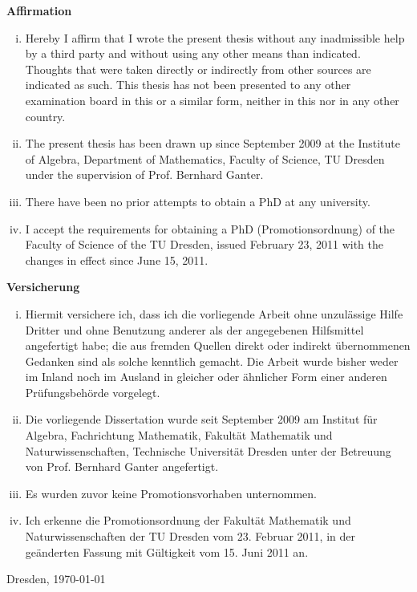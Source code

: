 \cleardoublepage
\thispagestyle{empty}

\begin{flushright}
  \LARGE\bfseries Affirmation
\end{flushright}
\medskip

\begin{enumerate}[i. ]
\item Hereby I affirm that I wrote the present thesis without any inadmissible help by a
  third party and without using any other means than indicated. Thoughts that were taken
  directly or indirectly from other sources are indicated as such. This thesis has not
  been presented to any other examination board in this or a similar form, neither in this
  nor in any other country.

\item The present thesis has been drawn up since September 2009 at the Institute of
  Algebra, Department of Mathematics, Faculty of Science, TU Dresden under the supervision
  of Prof. Bernhard Ganter.

\item There have been no prior attempts to obtain a PhD at any university.

\item I accept the requirements for obtaining a PhD (Promotionsordnung) of the Faculty of
  Science of the TU Dresden, issued February 23, 2011 with the changes in effect since June
  15, 2011.
\end{enumerate}


\begin{flushright}
  \LARGE\bfseries Versicherung
\end{flushright}
\medskip

\begin{enumerate}[i. ]
\item Hiermit versichere ich, dass ich die vorliegende Arbeit ohne unzulässige Hilfe
  Dritter und ohne Benutzung anderer als der angegebenen Hilfsmittel angefertigt habe; die
  aus fremden Quellen direkt oder indirekt übernommenen Gedanken sind als solche kenntlich
  gemacht. Die Arbeit wurde bisher weder im Inland noch im Ausland in gleicher oder
  ähnlicher Form einer anderen Prüfungsbehörde vorgelegt.

\item Die vorliegende Dissertation wurde seit September 2009 am Institut für Algebra,
  Fachrichtung Mathematik, Fakultät Mathematik und Naturwissenschaften, Technische
  Universität Dresden unter der Betreuung von Prof. Bernhard Ganter angefertigt.

\item Es wurden zuvor keine Promotionsvorhaben unternommen.

\item Ich erkenne die Promotionsordnung der Fakultät Mathematik und Naturwissenschaften
  der TU Dresden vom 23. Februar 2011, in der geänderten Fassung mit Gültigkeit vom
  15. Juni 2011 an.
\end{enumerate}


\vfill

Dresden, \today

